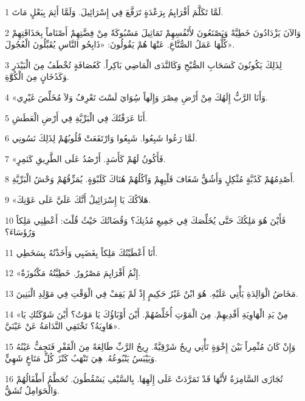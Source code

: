 \par 1 لَمَّا تَكَلَّمَ أَفْرَايِمُ بِرَعْدَةٍ تَرَفَّعَ فِي إِسْرَائِيلَ. وَلَمَّا أَثِمَ بِبَعْلٍ مَاتَ.
\par 2 وَالآنَ يَزْدَادُونَ خَطِيَّةً وَيَصْنَعُونَ لأَنْفُسِهِمْ تَمَاثِيلَ مَسْبُوكَةً مِنْ فِضَّتِهِمْ أَصْنَاماً بِحَذَاقَتِهِمْ كُلُّهَا عَمَلُ الصُّنَّاعِ. عَنْهَا هُمْ يَقُولُونَ: «ذَابِحُو النَّاسِ يُقَبِّلُونَ الْعُجُولَ».
\par 3 لِذَلِكَ يَكُونُونَ كَسَحَابِ الصُّبْحِ وَكَالنَّدَى الْمَاضِي بَاكِراً. كَعُصَافَةٍ تُخْطَفُ مِنَ الْبَيْدَرِ وَكَدُخَانٍ مِنَ الْكُوَّّةِ.
\par 4 «وَأَنَا الرَّبُّ إِلَهُكَ مِنْ أَرْضِ مِصْرَ وَإِلَهاً سُِوَايَ لَسْتَ تَعْرِفُ وَلاَ مُخَلِّصَ غَيْرِي.
\par 5 أَنَا عَرَفْتُكَ فِي الْبَرِّيَّةِ فِي أَرْضِ الْعَطَشِ.
\par 6 لَمَّا رَعُوا شَبِعُوا. شَبِعُوا وَارْتَفَعَتْ قُلُوبُهُمْ لِذَلِكَ نَسُونِي.
\par 7 «فَأَكُونُ لَهُمْ كَأَسَدٍ. أَرْصُدُ عَلَى الطَّرِيقِ كَنَمِرٍ.
\par 8 أَصْدِمُهُمْ كَدُبَّةٍ مُثْكِلٍ وَأَشُقُّ شَغَافَ قَلْبِهِمْ وَآكُلُهُمْ هُنَاكَ كَلَبْوَةٍ. يُمَزِّقُهُمْ وَحْشُ الْبَرِّيَّةِ.
\par 9 «هَلاَكُكَ يَا إِسْرَائِيلُ أَنَّكَ عَلَيَّ عَلَى عَوْنِكَ.
\par 10 فَأَيْنَ هُوَ مَلِكُكَ حَتَّى يُخَلِّصَكَ فِي جَمِيعِ مُدُنِكَ؟ وَقُضَاتُكَ حَيْثُ قُلْتَ: أَعْطِنِي مَلِكاً وَرُؤَسَاءَ؟
\par 11 أَنَا أَعْطَيْتُكَ مَلِكاً بِغَضَبِي وَأَخَذْتُهُ بِسَخَطِي.
\par 12 «إِثْمُ أَفْرَايِمَ مَصْرُورٌ. خَطِيَّتُهُ مَكْنُوزَةٌ.
\par 13 مَخَاضُ الْوَالِدَةِ يَأْتِي عَلَيْهِ. هُوَ ابْنٌ غَيْرُ حَكِيمٍ إِذْ لَمْ يَقِفْ فِي الْوَقْتِ فِي مَوْلِدِ الْبَنِينَ.
\par 14 «مِنْ يَدِ الْهَاوِيَةِ أَفْدِيهِمْ. مِنَ الْمَوْتِ أُخَلِّصُهُمْ. أَيْنَ أَوْبَاؤُكَ يَا مَوْتُ؟ أَيْنَ شَوْكَتُكِ يَا هَاوِيَةُ؟ تَخْتَفِي النَّدَامَةُ عَنْ عَيْنَيَّ».
\par 15 وَإِنْ كَانَ مُثْمِراً بَيْنَ إِخْوَةٍ تَأْتِي رِيحٌ شَرْقِيَّةٌ. رِيحُ الرَّبِّ طَالِعَةً مِنَ الْقَفْرِ فَتَجِفُّ عَيْنُهُ وَيَيْبَسُ يَنْبُوعُهُ. هِيَ تَنْهَبُ كَنْزَ كُلِّ مَتَاعٍ شَهِيٍّ.
\par 16 تُجَازَى السَّامِرَةُ لأَنَّهَا قَدْ تَمَرَّدَتْ عَلَى إِلَهِهَا. بِالسَّيْفِ يَسْقُطُونَ. تُحَطَّمُ أَطْفَالُهُمْ وَالْحَوَامِلُ تُشَقُّ.

